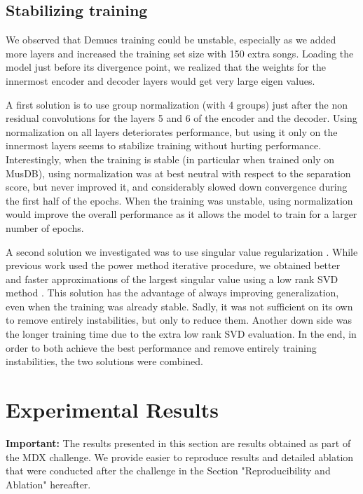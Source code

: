 \documentclass[10pt,a4paper,onecolumn]{article}
\begin{document}
\hypertarget{stabilizing-training}{%
\subsection{Stabilizing training}\label{stabilizing-training}}

We observed that Demucs training could be unstable, especially as we
added more layers and increased the training set size with 150 extra
songs. Loading the model just before its divergence point, we realized
that the weights for the innermost encoder and decoder layers would get
very large eigen values.

A first solution is to use group normalization (with 4 groups) just
after the non residual convolutions for the layers 5 and 6 of the
encoder and the decoder. Using normalization on all layers deteriorates
performance, but using it only on the innermost layers seems to
stabilize training without hurting performance. Interestingly, when the
training is stable (in particular when trained only on MusDB), using
normalization was at best neutral with respect to the separation score,
but never improved it, and considerably slowed down convergence during
the first half of the epochs. When the training was unstable, using
normalization would improve the overall performance as it allows the
model to train for a larger number of epochs.

A second solution we investigated was to use singular value
regularization \citep{spectral}. While previous work used the power
method iterative procedure, we obtained better and faster approximations
of the largest singular value using a low rank SVD method
\citep{lowranksvd}. This solution has the advantage of always improving
generalization, even when the training was already stable. Sadly, it was
not sufficient on its own to remove entirely instabilities, but only to
reduce them. Another down side was the longer training time due to the
extra low rank SVD evaluation. In the end, in order to both achieve the
best performance and remove entirely training instabilities, the two
solutions were combined.

\newpage

\hypertarget{experimental-results}{%
\section{Experimental Results}\label{experimental-results}}

\textbf{Important:} The results presented in this section are results obtained
as part of the MDX challenge. We provide easier to reproduce results and detailed ablation
that were conducted after the challenge in the Section "Reproducibility and Ablation" hereafter.
\end{document}
